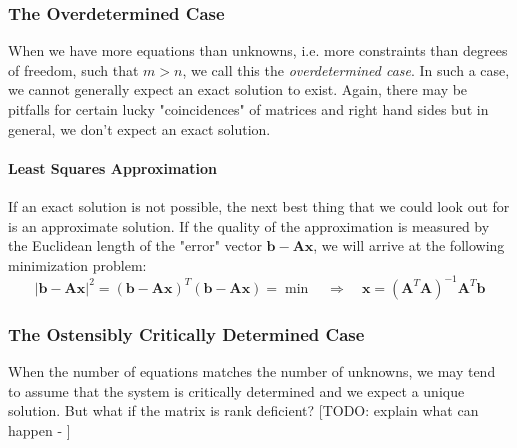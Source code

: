 \subsubsection{The Overdetermined Case}
When we have more equations than unknowns, i.e. more constraints than degrees of freedom, such that $m > n$, we call this the \emph{overdetermined case}. In such a case, we cannot generally expect an exact solution to exist. Again, there may be pitfalls for certain lucky "coincidences" of matrices and right hand sides but in general, we don't expect an exact solution.

\paragraph{Least Squares Approximation}
If an exact solution is not possible, the next best thing that we could look out for is an approximate solution. If the quality of the approximation is measured by the Euclidean length of the "error" vector $\mathbf{b} - \mathbf{A x}$, we will arrive at the following minimization problem:
\begin{equation}
|\mathbf{b} - \mathbf{A x}|^2 = (\mathbf{b} - \mathbf{A x})^T (\mathbf{b} - \mathbf{A x}) = \min
\quad \Rightarrow \quad
\boxed{ \mathbf{x} = (\mathbf{A}^T \mathbf{A})^{-1} \mathbf{A}^T \mathbf{b} }
\end{equation}






\subsubsection{The Ostensibly Critically Determined Case}
When the number of equations matches the number of unknowns, we may tend to assume that the system is critically determined and we expect a unique solution. But what if the matrix is rank deficient? [TODO: explain what can happen - ] %


